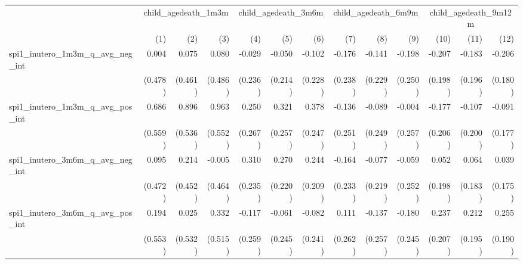 \begin{tabular}{lrrrrrrrrrrrr}
\toprule
                                            &  \multicolumn{3}{c}{child\_agedeath\_1m3m} &  \multicolumn{3}{c}{child\_agedeath\_3m6m} &  \multicolumn{3}{c}{child\_agedeath\_6m9m} & \multicolumn{3}{c}{child\_agedeath\_9m12m} \\ 
\cmidrule(lr){2-4} \cmidrule(lr){5-7} \cmidrule(lr){8-10} \cmidrule(lr){11-13} 
                                            &          (1) &          (2) &          (3) &          (4) &          (5) &          (6) &          (7) &          (8) &          (9) &         (10) &         (11) &         (12) \\ 
\midrule
spi1\_inutero\_1m3m\_q\_avg\_neg\_int       &        0.004 &        0.075 &        0.080 &       -0.029 &       -0.050 &       -0.102 &       -0.176 &       -0.141 &       -0.198 &       -0.207 &       -0.183 &       -0.206 \\ 
                                            &      (0.478) &      (0.461) &      (0.486) &      (0.236) &      (0.214) &      (0.228) &      (0.238) &      (0.229) &      (0.250) &      (0.198) &      (0.196) &      (0.180) \\ 
spi1\_inutero\_1m3m\_q\_avg\_pos\_int       &        0.686 &        0.896 &        0.963 &        0.250 &        0.321 &        0.378 &       -0.136 &       -0.089 &       -0.004 &       -0.177 &       -0.107 &       -0.091 \\ 
                                            &      (0.559) &      (0.536) &      (0.552) &      (0.267) &      (0.257) &      (0.247) &      (0.251) &      (0.249) &      (0.257) &      (0.206) &      (0.200) &      (0.177) \\ 
spi1\_inutero\_3m6m\_q\_avg\_neg\_int       &        0.095 &        0.214 &       -0.005 &        0.310 &        0.270 &        0.244 &       -0.164 &       -0.077 &       -0.059 &        0.052 &        0.064 &        0.039 \\ 
                                            &      (0.472) &      (0.452) &      (0.464) &      (0.235) &      (0.220) &      (0.209) &      (0.233) &      (0.219) &      (0.252) &      (0.198) &      (0.183) &      (0.175) \\ 
spi1\_inutero\_3m6m\_q\_avg\_pos\_int       &        0.194 &        0.025 &        0.332 &       -0.117 &       -0.061 &       -0.082 &        0.111 &       -0.137 &       -0.180 &        0.237 &        0.212 &        0.255 \\ 
                                            &      (0.553) &      (0.532) &      (0.515) &      (0.259) &      (0.245) &      (0.241) &      (0.262) &      (0.257) &      (0.245) &      (0.207) &      (0.195) &      (0.190) \\ 

\end{tabular}
